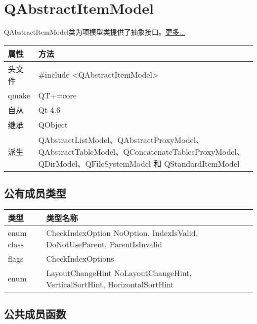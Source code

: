 \chapter{QAbstractItemModel}

QAbstractItemModel类为项模型类提供了抽象接口。\href{https://github.com/JackLovel/QtDocumentCN/blob/master/Src/A/QAbstractItemModel}{更多...} 

\setlength\extrarowheight{2pt}
\begin{tabular}{|m{5em}|m{25em}|}
	\hline
	属性 & 方法 \\
	\hline
	头文件 & \#include <QAbstractItemModel>\\      
	\hline
	qmake & QT+=core\\      
	\hline
	自从 & Qt 4.6\\
	\hline
	继承&QObject \\
	\hline
	派生 & QAbstractListModel、QAbstractProxyModel、
           QAbstractTableModel、QConcatenateTablesProxyModel、QDirModel、QFileSystemModel 和 QStandardItemModel \\
	\hline
\end{tabular}

\splitLine

\section{公有成员类型}

\begin{tabular}{|m{10em}|m{30em}|}
	\hline
	类型 & 类型名称 \\
	\hline
enum class&	CheckIndexOption{ NoOption, IndexIsValid,
  DoNotUseParent, ParentIsInvalid}\\
\hline
flags&	CheckIndexOptions\\
\hline
enum&	LayoutChangeHint { NoLayoutChangeHint, VerticalSortHint, HorizontalSortHint }\\
\hline
\end{tabular}


\splitLine

\section{公共成员函数}

